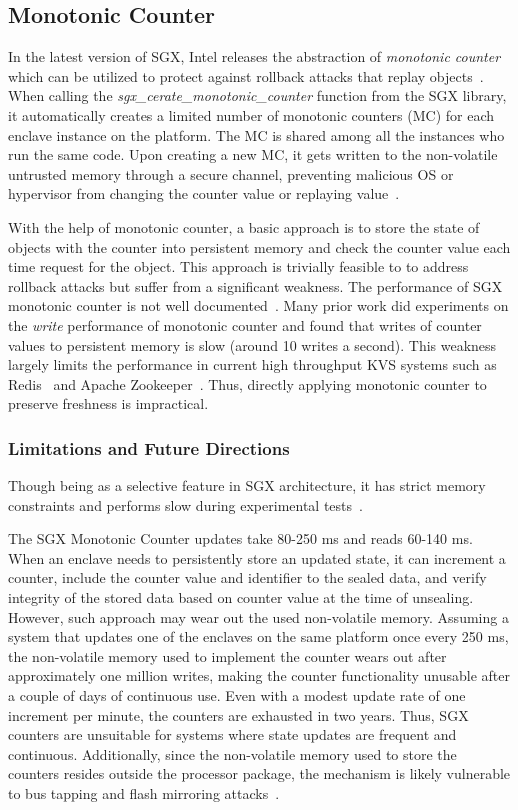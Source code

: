 

\subsection{Monotonic Counter}

In the latest version of SGX, Intel releases the abstraction of \textit{monotonic counter} which can be utilized to 
protect against rollback attacks that replay objects~\cite{}. When calling the 
\textit{sgx\_cerate\_monotonic\_counter} function from the SGX library, it automatically creates a 
limited number of monotonic counters (MC) for each enclave instance on the platform. The MC is shared 
among all the instances who run the same code. Upon creating a new MC, it gets written to the non-volatile
untrusted memory through a secure channel, preventing malicious OS or hypervisor from changing the counter 
value or replaying value~\cite{}.

With the help of monotonic counter, a basic approach is to store
the state of objects with the counter into persistent memory and check the counter value 
each time request for the object. This approach is trivially feasible to to address 
rollback attacks but suffer from a significant weakness. The performance of SGX monotonic 
counter is not well documented~\cite{}. Many prior work did experiments on the \textit{write}
performance of monotonic counter and found that writes of counter values to persistent
memory is slow (around 10 writes a second). This weakness largely limits the performance in 
current high throughput KVS systems such as Redis~\cite{} and Apache Zookeeper~\cite{}.
Thus, directly applying monotonic counter to preserve freshness is impractical.



\subsubsection{Limitations and Future Directions}
Though being as a selective feature in SGX architecture, it has strict memory constraints and performs slow during experimental tests~\cite{}. 

The SGX Monotonic Counter updates take 80-250 ms and reads 60-140 ms. When an enclave needs to persistently store an updated state, it can increment a counter, include the counter value and identifier to the sealed data, and verify integrity of the stored data based on counter value at the time of unsealing. However, such approach may wear out the used non-volatile memory. Assuming a system that updates one of the enclaves on the same platform once every 250 ms, the non-volatile memory used to implement the counter wears out after approximately one million writes, making the counter functionality unusable after a couple of days of continuous use. Even with a modest update rate of one increment per minute, the counters are exhausted in two years. Thus, SGX counters are unsuitable for systems where state updates are frequent and continuous. Additionally, since the non-volatile memory used to store the counters resides outside the processor package, the mechanism is likely vulnerable to bus tapping and flash mirroring attacks~\cite{}.


